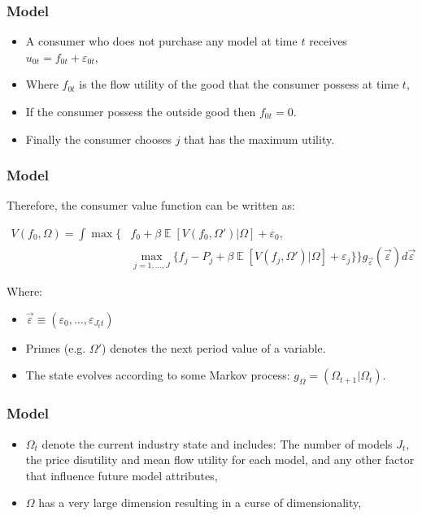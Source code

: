 \documentclass{beamer}
\theoremstyle{definition}
\begin{document}
\begin{frame}
  \frametitle{Model}

  \begin{itemize}
    \item A consumer who does not purchase any model at time $t$ receives $u_{0t} =
      f_{0t} + \varepsilon_{0t}$,
    \item Where $f_{0t}$ is the flow utility of the good that the consumer
      possess at time $t$,
    \item If the consumer possess the outside good then $f_{0t} = 0$.
    \item Finally the consumer chooses $j$ that has the maximum utility.
  \end{itemize}
\end{frame}

\begin{frame}
  \frametitle{Model}

  Therefore, the consumer value function can be written as:

  \begin{align}
    V(f_0, \Omega) = \int \max \bigg\{& f_0 + \beta
    \mathop{\mathbb{E}} [V(f_0,\Omega')|\Omega] + \varepsilon_0, \\
    & \max_{j = 1,\ldots ,J} \{f_j -P_j + \beta
    \mathop{\mathbb{E}} [V(f_j, \Omega')|\Omega] + \varepsilon_j\}\bigg\}
    g_{\vec{\varepsilon}}(\vec{\varepsilon})d\vec{\varepsilon}
  \end{align}

  Where:
  \begin{itemize}
    \item $\vec{\varepsilon} \equiv (\varepsilon_0, \ldots,
    \varepsilon_{J_tt})$
    \item Primes (e.g. $\Omega'$) denotes the next period value of a variable.
    \item The state evolves according to some Markov process: $g_{\Omega} =
      (\Omega_{t+1}|\Omega_t)$.
  \end{itemize} 
\end{frame}

\begin{frame}
  \frametitle{Model}

  \begin{itemize}
    \item $\Omega_t$ denote the current industry state and includes: The number
      of models $J_t$, the price disutility and mean flow utility for each
      model, and any other factor that influence future model attributes,
    \item $\Omega$ has a very large dimension resulting in a curse of
      dimensionality,
  \end{itemize}

\end{frame}
\end{document}
